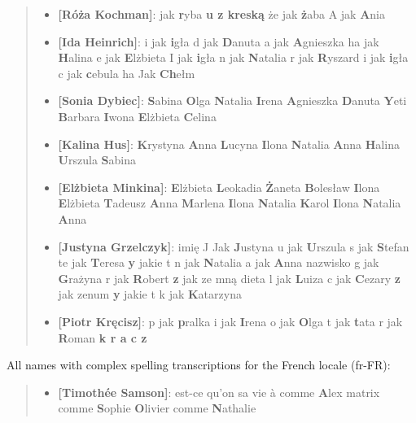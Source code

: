 \documentclass[11pt]{article}
\begin{document}
{\begin{quote}
{\begin{itemize}[align=left,leftmargin=5pt,rightmargin=-10pt]
\item \textbf{[Róża Kochman]}: jak \textbf{r}yba \textbf{u z kreską} że jak \textbf{ż}aba A jak \textbf{A}nia

\item \textbf{[Ida Heinrich]}: i jak \textbf{i}gła d jak \textbf{D}anuta a jak \textbf{A}gnieszka ha jak \textbf{H}alina e jak \textbf{E}lżbieta I jak \textbf{i}gła n jak \textbf{N}atalia r jak \textbf{R}yszard i jak \textbf{i}gła c jak \textbf{c}ebula ha Jak \textbf{Ch}ełm

\item \textbf{[Sonia Dybiec]}: \textbf{S}abina \textbf{O}lga \textbf{N}atalia \textbf{I}rena \textbf{A}gnieszka \textbf{D}anuta \textbf{Y}eti \textbf{B}arbara \textbf{I}wona \textbf{E}lżbieta \textbf{C}elina

\item \textbf{[Kalina Hus]}: \textbf{K}rystyna \textbf{A}nna \textbf{L}ucyna \textbf{I}lona \textbf{N}atalia \textbf{A}nna \textbf{H}alina \textbf{U}rszula \textbf{S}abina

\item \textbf{[Elżbieta Minkina]}: \textbf{E}lżbieta \textbf{L}eokadia \textbf{Ż}aneta \textbf{B}olesław \textbf{I}lona \textbf{E}lżbieta \textbf{T}adeusz \textbf{A}nna \textbf{M}arlena \textbf{I}lona \textbf{N}atalia \textbf{K}arol \textbf{I}lona \textbf{N}atalia \textbf{A}nna

\item \textbf{[Justyna Grzelczyk]}: imię J Jak \textbf{J}ustyna u jak \textbf{U}rszula s jak \textbf{S}tefan te jak \textbf{T}eresa \textbf{y} jakie t n jak \textbf{N}atalia a jak \textbf{A}nna nazwisko g jak \textbf{G}rażyna r jak \textbf{R}obert \textbf{z} jak ze mną dieta l jak \textbf{L}uiza c jak \textbf{C}ezary \textbf{z} jak zenum \textbf{y} jakie t k jak \textbf{K}atarzyna

\item \textbf{[Piotr Kręcisz]}: p jak \textbf{p}ralka i jak \textbf{I}rena o jak \textbf{O}lga t jak \textbf{t}ata r jak \textbf{R}oman \textbf{k r a c z}

\end{itemize}}
\end{quote}
All  names with complex spelling transcriptions for the French locale (fr-FR):
\begin{quote}
{\small
\begin{itemize}[align=left,leftmargin=5pt,rightmargin=-10pt]
\item \textbf{[Timothée Samson]}: est-ce qu'on sa vie à comme \textbf{A}lex matrix comme \textbf{S}ophie \textbf{O}livier comme \textbf{N}athalie


\end{itemize}}
\end{quote}}
\end{document}
